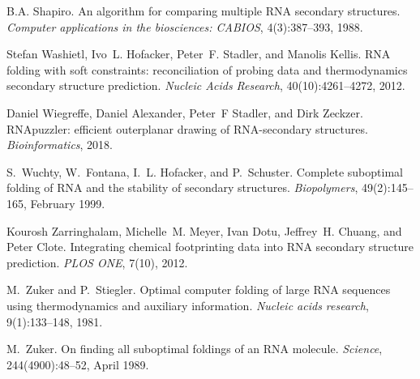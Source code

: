\begin{DoxyDescription}
\item[\label{citelist_CITEREF_shapiro:1988}%
\Hypertarget{citelist_CITEREF_shapiro:1988}%
\mbox{[}22\mbox{]}]B.\+A. Shapiro. An algorithm for comparing multiple RNA secondary structures. {\itshape Computer applications in the biosciences\+: CABIOS}, 4(3)\+:387--393, 1988.


\item[\label{citelist_CITEREF_washietl:2012}%
\Hypertarget{citelist_CITEREF_washietl:2012}%
\mbox{[}23\mbox{]}]Stefan Washietl, Ivo~L. Hofacker, Peter~F. Stadler, and Manolis Kellis. RNA folding with soft constraints\+: reconciliation of probing data and thermodynamics secondary structure prediction. {\itshape Nucleic Acids Research}, 40(10)\+:4261--4272, 2012.


\item[\label{citelist_CITEREF_wiegreffe:2018}%
\Hypertarget{citelist_CITEREF_wiegreffe:2018}%
\mbox{[}24\mbox{]}]Daniel Wiegreffe, Daniel Alexander, Peter~F Stadler, and Dirk Zeckzer. RNApuzzler\+: efficient outerplanar drawing of RNA-\/secondary structures. {\itshape Bioinformatics}, 2018.


\item[\label{citelist_CITEREF_wuchty:1999}%
\Hypertarget{citelist_CITEREF_wuchty:1999}%
\mbox{[}25\mbox{]}]S.~Wuchty, W.~Fontana, I.~L. Hofacker, and P.~Schuster. Complete suboptimal folding of RNA and the stability of secondary structures. {\itshape Biopolymers}, 49(2)\+:145--165, February 1999.


\item[\label{citelist_CITEREF_zarringhalam:2012}%
\Hypertarget{citelist_CITEREF_zarringhalam:2012}%
\mbox{[}26\mbox{]}]Kourosh Zarringhalam, Michelle~M. Meyer, Ivan Dotu, Jeffrey~H. Chuang, and Peter Clote. Integrating chemical footprinting data into RNA secondary structure prediction. {\itshape PLOS ONE}, 7(10), 2012.


\item[\label{citelist_CITEREF_zuker:1981}%
\Hypertarget{citelist_CITEREF_zuker:1981}%
\mbox{[}27\mbox{]}]M.~Zuker and P.~Stiegler. Optimal computer folding of large RNA sequences using thermodynamics and auxiliary information. {\itshape Nucleic acids research}, 9(1)\+:133--148, 1981.


\item[\label{citelist_CITEREF_zuker:1989}%
\Hypertarget{citelist_CITEREF_zuker:1989}%
\mbox{[}28\mbox{]}]M.~Zuker. On finding all suboptimal foldings of an RNA molecule. {\itshape Science}, 244(4900)\+:48--52, April 1989.


\end{DoxyDescription}